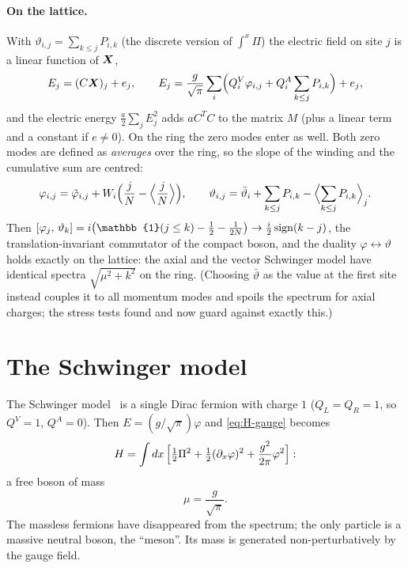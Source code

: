 \paragraph{On the lattice.} With $\vartheta_{i,j} = \sum_{k\leq j}P_{i,k}$ (the discrete version of
$\int^x\Pi$) the electric field on site $j$ is a linear function of $\bm{X}$,
\begin{equation}
  E_j = (C\bm{X})_j + e_j,\qquad
  E_j = \frac{g}{\sqrt\pi}\sum_i\Bigl(Q^V_i\varphi_{i,j} + Q^A_i\sum_{k\leq j}P_{i,k}\Bigr) + e_j ,
\end{equation}
and the electric energy $\frac a2\sum_jE_j^2$ adds $aC^TC$ to the matrix $M$ (plus a linear term and a constant
if $e\neq0$). On the ring the zero modes enter as well. Both zero modes are defined as \emph{averages} over the
ring, so the slope of the winding and the cumulative sum are centred:
\begin{equation}
  \varphi_{i,j} = \tilde\varphi_{i,j} + W_i\Bigl(\frac jN - \Bigl\langle\frac jN\Bigr\rangle\Bigr),\qquad
  \vartheta_{i,j} = \bar\vartheta_i + \sum_{k\leq j}P_{i,k} - \Bigl\langle\sum_{k\leq j}P_{i,k}\Bigr\rangle_j .
\end{equation}
Then $\comm{\varphi_j}{\vartheta_k} = i\bigl(\mathbb{1}(j\leq k) - \frac12 - \frac1{2N}\bigr)\to\frac i2\operatorname{sign}(k-j)$,
the translation-invariant commutator of the compact boson, and the duality $\varphi\leftrightarrow\vartheta$ holds
exactly on the lattice: the axial and the vector Schwinger model have identical spectra $\sqrt{\mu^2+k^2}$ on the ring.
(Choosing $\bar\vartheta$ as the value at the first site instead couples it to all momentum modes and spoils the
spectrum for axial charges; the stress tests found and now guard against exactly this.)

\section{The Schwinger model}
The Schwinger model~\cite{Schwinger1962,LowensteinSwieca1971} is a single Dirac fermion with charge $1$
($Q_L = Q_R = 1$, so $Q^V = 1$, $Q^A = 0$). Then $E = (g/\sqrt\pi)\varphi$ and \eqref{eq:H-gauge} becomes
\begin{equation}
  H = \int dx\,\Bigl[\tfrac12\Pi^2 + \tfrac12(\partial_x\varphi)^2 + \frac{g^2}{2\pi}\varphi^2\Bigr]:
\end{equation}
a free boson of mass
\begin{equation}\label{eq:schwinger-mass}
  \mu = \frac{g}{\sqrt\pi} .
\end{equation}
The massless fermions have disappeared from the spectrum; the only particle is a massive neutral boson, the
``meson''. Its mass is generated non-perturbatively by the gauge field.

